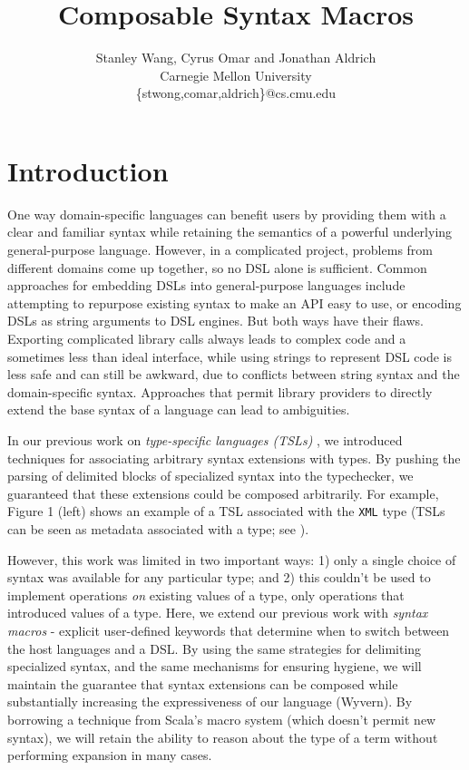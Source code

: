 \documentclass[letterpaper, notitlepage]{article}
\begin{document}
\title{Composable Syntax Macros}
\author{Stanley Wang, Cyrus Omar and Jonathan Aldrich\\
Carnegie Mellon University\\
\{stwong,comar,aldrich\}@cs.cmu.edu}
\date{}
\maketitle

\section{Introduction}
One way domain-specific languages can benefit users by providing them with a clear and familiar syntax while retaining the semantics of a powerful underlying general-purpose language. However, in a complicated project, problems from different domains come up together, so no DSL alone is sufficient. Common approaches for embedding DSLs into general-purpose languages include attempting to repurpose existing syntax to make an API easy to use, or encoding DSLs as string arguments to DSL engines. But both ways have their flaws. Exporting complicated library calls always leads to complex code and a sometimes less than ideal interface, while using strings to represent DSL code is less safe and can still be awkward, due to conflicts between string syntax and the domain-specific syntax. Approaches that permit library providers to directly extend the base syntax of a language can lead to ambiguities.

In our previous work on \emph{type-specific languages (TSLs)} \cite{TSLs}, we introduced techniques for associating arbitrary syntax extensions with types. By pushing the parsing of delimited blocks of specialized syntax into the typechecker, we guaranteed that these extensions could be composed arbitrarily. For example, Figure 1 (left) shows an example of a TSL associated with the \verb|XML| type (TSLs can be seen as metadata associated with a type; see \cite{TSLs}).

However, this work was limited in two important ways: 1) only a single choice of syntax was available for any particular type; and 2) this couldn't be used to implement operations \emph{on} existing values of a type, only operations that introduced values of a type. Here, we extend our previous work with \emph{syntax macros} - explicit user-defined keywords that determine when to switch between the host languages and a DSL. By using the same strategies for delimiting specialized syntax, and the same mechanisms for ensuring hygiene, we will maintain the guarantee that syntax extensions can be composed while substantially increasing the expressiveness of our language (Wyvern). By borrowing a technique from Scala's macro system (which doesn't permit new syntax), we will retain the ability to reason about the type of a term without performing expansion in many cases.
\end{document}
